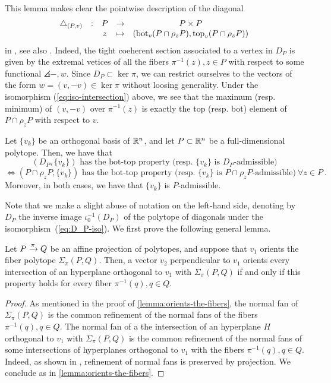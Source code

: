 This lemma makes clear the pointwise description of the diagonal 
\begin{equation*}
\begin{matrix}
    \triangle_{(P,v)} & : & P & \to & P \times P \\
    & & z  & \mapsto & (\operatorname{bot}_v(P \cap \rho_z P),\operatorname{top}_v(P \cap \rho_z P))
\end{matrix}
\end{equation*}
in \cite[Definition 10]{MTTV19}, see also \cite[Proposition 1.15]{GLA21}. 
Indeed, the tight coeherent section associated to a vertex in $D_P$ is given by the extremal vetices of all the fibers $\pi^{-1}(z), z \in P$ with respect to some functional $\angles{-,w}$.
Since $D_P \subset \ker \pi$, we can restrict ourselves to the vectors of the form $w=(v,-v) \in \ker \pi$ without loosing generality. 
Under the isomorphism (\ref{eq:iso-intersection}) above, we see that the maximum (resp. minimum) of $(v,-v)$ over $\pi^{-1}(z)$ is exactly the top (resp. bot) element of $P\cap \rho_z P$ with respect to $v$. 

\begin{proposition} \label{prop:bot-top-for-D_P}
    Let $\{v_k\}$ be an orthogonal basis of $\mathbb{R}^n$, and let $P\subset \mathbb{R}^n$ be a full-dimensional polytope. 
    Then, we have that
    \[
    (D_P,\{v_k\}) \text{ has the bot-top property (resp. } \{v_k\} \text{ is }D_P\text{-admissible)}  
    \]
    \[
    \iff (P\cap \rho_z P,\{v_k\}) \text{ has the bot-top property (resp. } \{v_k\} \text{ is }P\cap \rho_z P\text{-admissible)} \ \forall z \in P \ .
    \]
    Moreover, in both cases, we have that $\{v_k\}$ is $P$-admissible.
\end{proposition}
Note that we make a slight abuse of notation on the left-hand side, denoting by $D_P$ the inverse image $\iota_0^{-1}(D_P)$ of the polytope of diagonals under the isomorphism~(\ref{eq:D_P-iso}).
We first prove the following general lemma. 

\begin{lemma} \label{lemma:iterated-orientation}
    Let $P\xrightarrow{\pi} Q$ be an affine projection of polytopes, and suppose that $v_1$ orients the fiber polytope $\Sigma_\pi (P,Q)$. 
    Then, a vector $v_2$ perpendicular to $v_1$ orients every intersection of an hyperplane orthogonal to $v_1$ with $\Sigma_\pi (P,Q)$ if and only if this property holds for every fiber $\pi^{-1}(q), q \in Q$. 
\end{lemma}

\begin{proof}
    As mentioned in the proof of \cref{lemma:orients-the-fibers}, the normal fan of $\Sigma_\pi(P,Q)$ is the common refinement of the normal fans of the fibers $\pi^{-1}(q), q \in Q$. 
    The normal fan of a the intersection of an hyperplane $H$ orthogonal to $v_1$ with $\Sigma_\pi(P,Q)$ is the common refinement of the normal fans of some intersections of hyperplanes orthogonal to $v_1$ with the fibers $\pi^{-1}(q), q \in Q$. 
    Indeed, as shown in \cite[Lemma 3.1]{BilleraSturmfels94}, refinement of normal fans is preserved by projection.
    We conclude as in \cref{lemma:orients-the-fibers}.
\end{proof}

